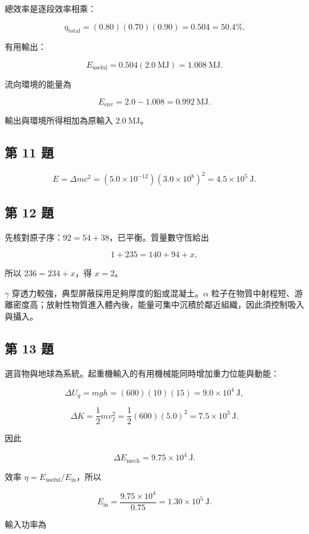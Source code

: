 \documentclass[11pt,a4paper]{article}
\begin{document}
總效率是逐段效率相乘：

\[
\eta_{\mathrm{total}}=(0.80)(0.70)(0.90)=0.504=50.4\%.
\]

有用輸出：

\[
E_{\mathrm{useful}}=0.504(2.0\ \mathrm{MJ})
=1.008\ \mathrm{MJ}.
\]

流向環境的能量為

\[
E_{\mathrm{env}}=2.0-1.008=0.992\ \mathrm{MJ}.
\]

輸出與環境所得相加為原輸入 \(2.0\ \mathrm{MJ}\)。

\subsection{第 11 題}\label{ux7b2c-11-ux984c}

\[
E=\Delta mc^2
=(5.0\times10^{-12})(3.0\times10^8)^2
=4.5\times10^5\ \mathrm J.
\]

\subsection{第 12 題}\label{ux7b2c-12-ux984c}

先核對原子序：\(92=54+38\)，已平衡。質量數守恆給出

\[
1+235=140+94+x,
\]

所以 \(236=234+x\)，得 \(x=2\)。

\(\gamma\) 穿透力較強，典型屏蔽採用足夠厚度的鉛或混凝土。\(\alpha\) 粒子在物質中射程短、游離密度高；放射性物質進入體內後，能量可集中沉積於鄰近組織，因此須控制吸入與攝入。

\subsection{第 13 題}\label{ux7b2c-13-ux984c}

選貨物與地球為系統。起重機輸入的有用機械能同時增加重力位能與動能：

\[
\Delta U_g=mgh=(600)(10)(15)=9.0\times10^4\ \mathrm J,
\]

\[
\Delta K=\frac12mv_f^2
=\frac12(600)(5.0)^2=7.5\times10^3\ \mathrm J.
\]

因此

\[
\Delta E_{\mathrm{mech}}=9.75\times10^4\ \mathrm J.
\]

效率 \(\eta=E_{\mathrm{useful}}/E_{\mathrm{in}}\)，所以

\[
E_{\mathrm{in}}=\frac{9.75\times10^4}{0.75}
=1.30\times10^5\ \mathrm J.
\]

輸入功率為
\end{document}
